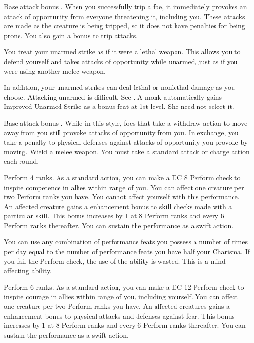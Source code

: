  Base attack bonus .
 When you successfully trip a foe, it immediately provokes an attack of opportunity from everyone threatening it, including you. These attacks are made as the creature is being tripped, so it does not have penalties for being prone. You also gain a  bonus to trip attacks.

 You treat your unarmed strike as if it were a lethal weapon. This allows you to defend yourself and takes attacks of opportunity while unarmed, just as if you were using another melee weapon.

In addition, your unarmed strikes can deal lethal or nonlethal damage as you choose.
 Attacking unarmed is difficult. See .
 A monk automatically gains Improved Unarmed Strike as a bonus feat at 1st level. She need not select it.

\featpre Base attack bonus .
\featben While in this style, foes that take a withdraw action to move away from you still provoke attacks of opportunity from you. In exchange, you take a  penalty to physical defenses against attacks of opportunity you provoke by moving.
\stylereq Wield a melee weapon. You must take a standard attack or charge action each round.

\featpre Perform 4 ranks.
\featben As a standard action, you can make a DC 8 Perform check to inspire competence in allies within \rngmed range of you. You can affect one creature per two Perform ranks you have. You cannot affect yourself with this performance. An affected creature gains a  enhancement bonus to skill checks made with a particular skill. This bonus increases by 1 at 8 Perform ranks and every 6 Perform ranks thereafter. You can sustain the performance as a swift action.

You can use any combination of performance feats you possess a number of times per day equal to the number of performance feats you have \add half your Charisma. If you fail the Perform check, the use of the ability is wasted. This is a mind-affecting ability.

\featpre Perform 6 ranks.
\featben As a standard action, you can make a DC 12 Perform check to inspire courage in allies within \rngmed range of you, including yourself. You can affect one creature per two Perform ranks you have. An affected creatures gains a  enhancement bonus to physical attacks and defenses against fear. This bonus increases by 1 at 8 Perform ranks and every 6 Perform ranks thereafter. You can sustain the performance as a swift action.

